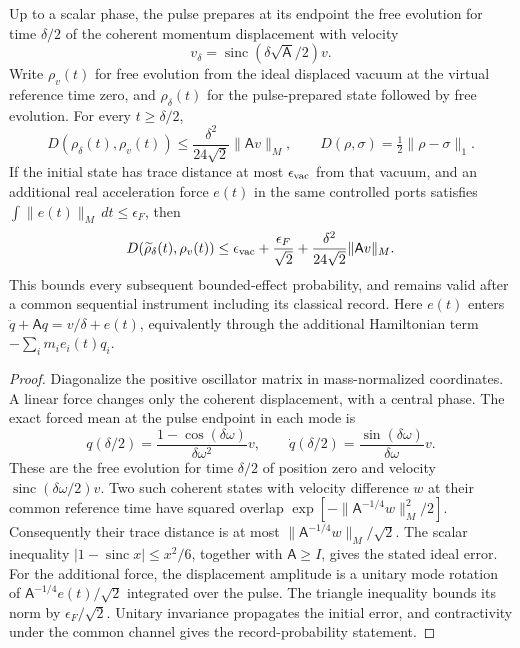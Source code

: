\begin{proposition}
Up to a scalar phase, the pulse prepares at its endpoint the free evolution
for time $\delta/2$ of the coherent momentum displacement with velocity
\[
 v_\delta=\operatorname{sinc}(\delta\sqrt{\mathsf A}/2)v.
\]
Write $\rho_v(t)$ for free evolution from the ideal displaced vacuum at
the virtual reference time zero, and $\rho_\delta(t)$ for the pulse-prepared
state followed by free evolution. For every $t\ge\delta/2$,
\[
 D(\rho_\delta(t),\rho_v(t))
 \le \frac{\delta^2}{24\sqrt2}\|\mathsf A v\|_M,
 \qquad D(\rho,\sigma)=\tfrac12\|\rho-\sigma\|_1.
\]
If the initial state has trace distance at most $\epsilon_{\rm vac}$ from
that vacuum, and an additional real acceleration force $e(t)$ in the same
controlled ports satisfies $\int\|e(t)\|_M\,dt\le\epsilon_F$, then
\[
 D(\widetilde\rho_\delta(t),\rho_v(t))
 \le \epsilon_{\rm vac}+\frac{\epsilon_F}{\sqrt2}
       +\frac{\delta^2}{24\sqrt2}\|\mathsf A v\|_M.
\]
This bounds every subsequent bounded-effect probability, and remains valid
after a common sequential instrument including its classical record.
Here $e(t)$ enters $\ddot q+\mathsf A q=v/\delta+e(t)$, equivalently
through the additional Hamiltonian term $-\sum_i m_i e_i(t)q_i$.
\end{proposition}
\begin{proof}
Diagonalize the positive oscillator matrix in mass-normalized coordinates.
A linear force changes only the coherent displacement, with a central phase.
The exact forced mean at the pulse endpoint in each mode is
\[
 q(\delta/2)=\frac{1-\cos(\delta\omega)}{\delta\omega^2}v,
 \qquad \dot q(\delta/2)=\frac{\sin(\delta\omega)}{\delta\omega}v.
\]
These are the free evolution for time $\delta/2$ of position zero and
velocity $\operatorname{sinc}(\delta\omega/2)v$. Two such coherent states
with velocity difference $w$ at their common reference time have squared
overlap $\exp[-\|\mathsf A^{-1/4}w\|_M^2/2]$. Consequently their trace
distance is at most $\|\mathsf A^{-1/4}w\|_M/\sqrt2$.
The scalar inequality $|1-\operatorname{sinc}x|\le x^2/6$, together with
$\mathsf A\ge I$, gives the stated ideal error. For the additional force,
the displacement amplitude is a unitary mode rotation of
$\mathsf A^{-1/4}e(t)/\sqrt2$ integrated over the pulse. The triangle
inequality bounds its norm by $\epsilon_F/\sqrt2$. Unitary invariance
propagates the initial error, and contractivity under the common channel
gives the record-probability statement.
\end{proof}

